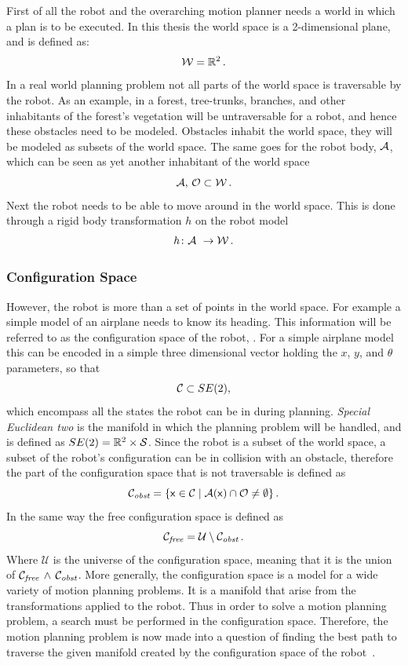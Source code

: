 First of all the robot and the overarching motion planner needs a world in which
a plan is to be executed. In this thesis the world space is a 2-dimensional
plane, and is defined as:
\[
  \mathcal{W} = \mathbb{R}^2 \, .
\]
In a real world planning problem not all parts of the world space is traversable
by the robot. As an example, in a forest, tree-trunks, branches, and other
inhabitants of the forest's vegetation will be untraversable for a robot, and
hence these obstacles need to be modeled. Obstacles inhabit the world space,
they will be modeled as subsets of the world space. The same goes for the robot
body, \(\mathcal{A}{}\), which can be seen as yet another inhabitant of the
world space \ie
\[
  \mathcal{A},\, \mathcal{O} \subset \mathcal{W} \, .
\]
Next the robot needs to be able to move around in the world space. This is done
through a rigid body transformation \(h\) on the robot model
\[
  h \colon \modelrobot\ \rightarrow \modelworld \mathEoS
\]


\subsubsection{Configuration Space}

However, the robot is more than a set of points in the world space. For example
a simple model of an airplane needs to know its heading. This information will
be referred to as the configuration space of the robot,
\modelconfigurationspace. For a simple airplane model this can be encoded in a
simple three dimensional vector holding the \(x\), \(y\), and \(\theta\)
parameters, so that
\[
  \mathcal{C} \subset SE(2),
\]
which encompass all the states the robot can be in during planning.
\textit{Special Euclidean two} is the manifold in which the planning problem
will be handled, and is defined as \(SE(2) = \mathbb{R}^2 \times \mathcal{S}\). Since
the robot is a subset of the world space, a subset of the robot's configuration
can be in collision with an obstacle, therefore the part of the configuration
space that is not traversable is defined as
\[
  \mathcal{C}_{\textit{obst}}{} = \lbrace{\mathbf{\mathsf{x}}} \in \mathcal{C}{} \mid
    \mathcal{A}({\mathbf{\mathsf{x}}}) \cap \mathcal{O}{} \neq \emptyset\rbrace \, .
\]
In the same way the free configuration space is defined as
\[
  \mathcal{C}_{\textit{free}}{} = \mathcal{U} \setminus
  \mathcal{C}_{\textit{obst}}{} \, .
\]
Where \(\mathcal{U}\) is the universe of the configuration space, meaning that
it is the union of \(\mathcal{C}_{\textit{free}}\, \wedge \,
\mathcal{C}_{\textit{obst}}\). More generally, the configuration space is a
model for a wide variety of motion planning problems. It is a manifold that
arise from the transformations applied to the robot. Thus in order to solve a
motion planning problem, a search must be performed in the configuration space.
Therefore, the motion planning problem is now made into a question of finding
the best path to traverse the given manifold created by the configuration space
of the robot~\cite{Lav06}.


